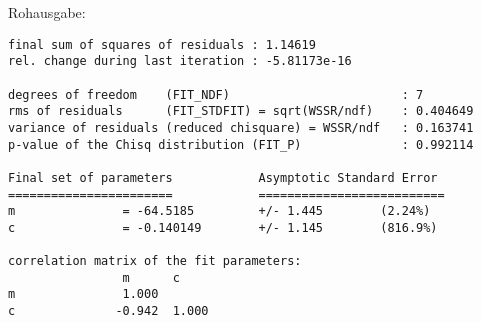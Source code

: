    \vspace{-\baselineskip}
    Rohausgabe:
    \begin{verbatim}
final sum of squares of residuals : 1.14619
rel. change during last iteration : -5.81173e-16

degrees of freedom    (FIT_NDF)                        : 7
rms of residuals      (FIT_STDFIT) = sqrt(WSSR/ndf)    : 0.404649
variance of residuals (reduced chisquare) = WSSR/ndf   : 0.163741
p-value of the Chisq distribution (FIT_P)              : 0.992114

Final set of parameters            Asymptotic Standard Error
=======================            ==========================
m               = -64.5185         +/- 1.445        (2.24%)
c               = -0.140149        +/- 1.145        (816.9%)

correlation matrix of the fit parameters:
                m      c      
m               1.000 
c              -0.942  1.000
    \end{verbatim}